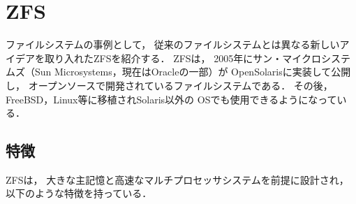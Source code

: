 \chapter{ZFS}
ファイルシステムの事例として，
従来のファイルシステムとは異なる新しいアイデアを取り入れたZFSを紹介する．
ZFSは，
2005年にサン・マイクロシステムズ（Sun Microsystems，現在はOracleの一部）が
OpenSolarisに実装して公開し，
オープンソースで開発されているファイルシステムである．
その後，FreeBSD，Linux等に移植されSolaris以外の
OSでも使用できるようになっている．

\section{特徴}
ZFSは，
大きな主記憶と高速なマルチプロセッサシステムを前提に設計され，
以下のような特徴を持っている．

